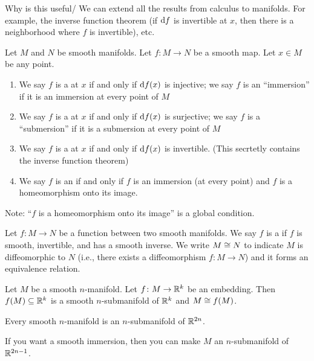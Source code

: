 \begin{node}
Why is this useful/ We can extend all the results from calculus to
manifolds. For example, the inverse function theorem (if $\mathrm{d} f$ is
invertible at $x$, then there is a neighborhood where $f$ is
invertible), etc.
\end{node}

\begin{definition}
Let $M$ and $N$ be smooth manifolds. Let $f\colon M\to N$ be a smooth map.
Let $x\in M$ be any point.
\begin{enumerate}
\item We say $f$ is a  at $x$ if and only if $\mathrm{d} f(x)$
is injective; we say $f$ is an ``immersion'' if it is an immersion at
every point of $M$
\item We say $f$ is a  at $x$ if and only if $\mathrm{d} f(x)$
is surjective; we say $f$ is a ``submersion'' if it is a submersion at
every point of $M$
\item We say $f$ is a  at $x$ if and only
  if $\mathrm{d} f(x)$ is invertible. (This secrtetly contains the inverse
  function theorem)
\item We say $f$ is an  if and only if $f$ is an
  immersion (at every point) and $f$ is a homeomorphism onto its image.
\end{enumerate}
Note: ``$f$ is a homeomorphism onto its image'' is a global condition.
\end{definition}

\begin{definition}[Diffeomorphism]
Let $f\colon M\to N$ be a function between two smooth manifolds. We
say $f$ is a  if $f$ is smooth, invertible, and
has a smooth inverse. We write $M\cong N$ to indicate $M$ is
diffeomorphic to $N$ (i.e., there exists a diffeomorphism $f\colon M\to N$)
and it forms an equivalence relation.
\end{definition}

\begin{proposition}
Let $M$ be a smooth $n$-manifold. Let $f\colon M\to\mathbb{R}^{k}$ be an
embedding. Then $f(M)\subseteq\mathbb{R}^{k}$ is a smooth $n$-submanifold of
$\mathbb{R}^{k}$ and $M\cong f(M)$.
\end{proposition}

\begin{theorem}
Every smooth $n$-manifold is an $n$-submanifold of $\mathbb{R}^{2n}$.
\end{theorem}

\begin{node}
If you want a smooth immersion, then you can make $M$ an
$n$-submanifold of $\mathbb{R}^{2n-1}$.
\end{node}